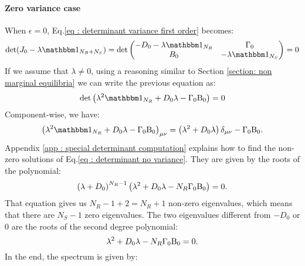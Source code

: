 \documentclass[12pt, titlepage, twoside, openright]{report}
\begin{document}
  \paragraph{Zero variance case}\label{sec : methods dynamical stability fully connected zero variance}
  When $\epsilon=0$, Eq.\eqref{eq : determinant variance first order} becomes:
  \begin{equation}
  \det(J_0-\lambda \identity{N_R+N_S})=\det\begin{pmatrix}
  -D_0-\lambda \identity{N_R} & \Gamma_0 \\
  B_0 & -\lambda \identity{N_S}
  \end{pmatrix}
  =
  0
  \end{equation}
  If we assume that $\lambda\neq 0$, using a reasoning similar to Section \ref{section: non marginal equilibria} we can write the previous equation as:
  \begin{equation}
  \det\left(\lambda^2 \identity{N_R}+D_0 \lambda - \Gamma_0 \Beta_0 \right)=0 \label{eq : determinant no variance}
  \end{equation}
  Component-wise, we have:
  \begin{equation}
  \left(\lambda^2 \identity{N_R}+D_0 \lambda - \Gamma_0 \Beta_0 \right)_{\mu\nu} = \left(\lambda^2+D_0 \lambda\right)\delta_{\mu \nu} - \Gamma_0\Beta_0.
  \end{equation}
  Appendix \ref{app : special determinant computation} explains how to find the non-zero solutions of Eq.\eqref{eq : determinant no variance}. They are given by the roots of the polynomial:
  \begin{equation}
  \left(\lambda+D_0\right)^{N_R-1}\left(\lambda^2+D_0 \lambda -N_R \Gamma_0 \text{B}_0\right)=0.
  \end{equation}
  That equation gives us $N_R-1+2=N_R+1$ non-zero eigenvalues, which means that there are $N_S-1$ zero eigenvalues. The two eigenvalues different from $-D_0$ or $0$ are the roots of the second degree polynomial:
  \begin{equation}
  \lambda^2 + D_0 \lambda- N_R \Gamma_0 \text{B}_0 =0.
  \end{equation}
  In the end, the spectrum is given by:
\end{document}
